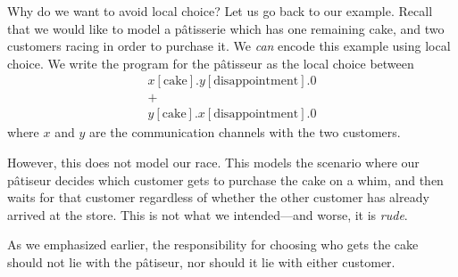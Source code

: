 \documentclass[twocolumn]{article}
\begin{document}
Why do we want to avoid local choice? Let us go back to our example.
Recall that we would like to model a p\^{a}tisserie which has one remaining
cake, and two customers racing in order to purchase it.
We \emph{can} encode this example using local choice.
We write the program for the p\^{a}tisseur as the local choice between
\begin{gather*}
  x[\text{cake}].y[\text{disappointment}].0 \\
  + \\
  y[\text{cake}].x[\text{disappointment}].0
\end{gather*}
where $x$ and $y$ are the communication channels with the two customers. 

However, this does not model our race.
This models the scenario where our p\^{a}tiseur decides which customer
gets to purchase the cake on a whim, and then waits for that customer
regardless of whether the other customer has already arrived at the store.
This is not what we intended---and worse, it is \emph{rude}.

As we emphasized earlier, the responsibility for choosing who gets the cake
should not lie with the p\^{a}tiseur, nor should it lie with either customer.
\end{document}
